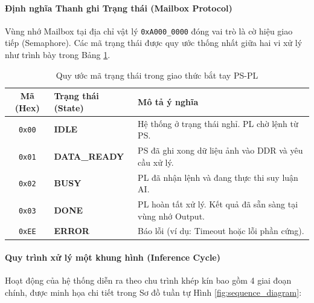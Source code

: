\paragraph{Định nghĩa Thanh ghi Trạng thái (Mailbox Protocol)}
Vùng nhớ Mailbox tại địa chỉ vật lý \texttt{0xA000\_0000} đóng vai trò là cờ hiệu giao tiếp (Semaphore). Các mã trạng thái được quy ước thống nhất giữa hai vi xử lý như trình bày trong Bảng \ref{tab:mailbox_states}.

\begin{table}[h]
\centering

\begin{tabular}{|c|l|l|}
\hline
\textbf{Mã (Hex)} & \textbf{Trạng thái (State)} & \textbf{Mô tả ý nghĩa} \\ \hline
\texttt{0x00} & \textbf{IDLE} & Hệ thống ở trạng thái nghỉ. PL chờ lệnh từ PS. \\ \hline
\texttt{0x01} & \textbf{DATA\_READY} & PS đã ghi xong dữ liệu ảnh vào DDR và yêu cầu xử lý. \\ \hline
\texttt{0x02} & \textbf{BUSY} & PL đã nhận lệnh và đang thực thi suy luận AI. \\ \hline
\texttt{0x03} & \textbf{DONE} & PL hoàn tất xử lý. Kết quả đã sẵn sàng tại vùng nhớ Output. \\ \hline
\texttt{0xEE} & \textbf{ERROR} & Báo lỗi (ví dụ: Timeout hoặc lỗi phần cứng). \\ \hline
\end{tabular}
\caption{Quy ước mã trạng thái trong giao thức bắt tay PS-PL}
\label{tab:mailbox_states}
\end{table}

\paragraph{Quy trình xử lý một khung hình (Inference Cycle)}
Hoạt động của hệ thống diễn ra theo chu trình khép kín bao gồm 4 giai đoạn chính, 
được minh họa chi tiết trong Sơ đồ tuần tự Hình \ref{fig:sequence_diagram}:


